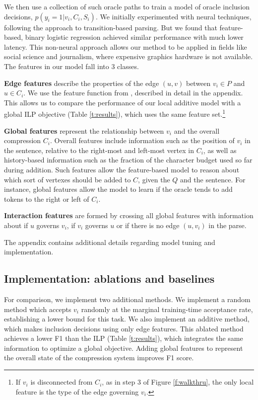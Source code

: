 \documentclass[11pt,a4paper]{article}
\begin{document}
We then use a collection of such oracle paths to train a model of oracle inclusion decisions, ${p(y_i  = 1 | v_i, C_i, S_i)}$. We initially experimented with neural techniques, following the \citet{D14-1082} approach to transition-based parsing. But we found that feature-based, binary logistic regression achieved similar performance with much lower latency. This non-neural approach allows our method to be applied in fields like social science and journalism, where expensive graphics hardware is not available. The features in our model fall into 3 classes.

\textbf{Edge features} describe the properties of the edge $(u,v)$ between $v_i \in P$ and $u \in C_i$. We use the feature function from \citet{filippova2013overcoming}, described in detail in the appendix. This allows us to compare the performance of our local additive model with a global ILP objective (Table \ref{t:results}), which uses the same feature set.\footnote{If $v_i$ is disconnected from $C_i$, as in step 3 of Figure \ref{f:walkthru}, the only local feature is the type of the edge governing $v_i$.}

\textbf{Global features} represent the relationship between $v_i$ and the overall compression $C_i$. Overall features include information such as the position of $v_i$ in the sentence, relative to the right-most and left-most vertex in $C_i$, as well as history-based information such as the fraction of the character budget used so far during addition. Such features allow the feature-based model to reason about which sort of vertexes should be added to $C$, given the $Q$ and the sentence. For instance, global features allow the model to learn if the oracle tends to add tokens to the right or left of $C_i$.

\textbf{Interaction features} are formed by crossing all global features with information about if $u$ governs $v_i$, if $v_i$ governs $u$ or if there is no edge $(u,v_i)$ in the parse.

The appendix contains additional details regarding model tuning and implementation. 

\subsection{Implementation: ablations and baselines}
For comparison, we implement two additional methods. We implement a random method which accepts $v_i$ randomly at the marginal training-time acceptance rate, establishing a lower bound for this task. We also implement an additive method, which makes inclusion decisions using only edge features. This ablated method achieves a lower F1 than the ILP (Table \ref{t:results}), which integrates the same information to optimize a global objective.
Adding global features to represent the overall state of the compression system improves F1 score. 
\end{document}
